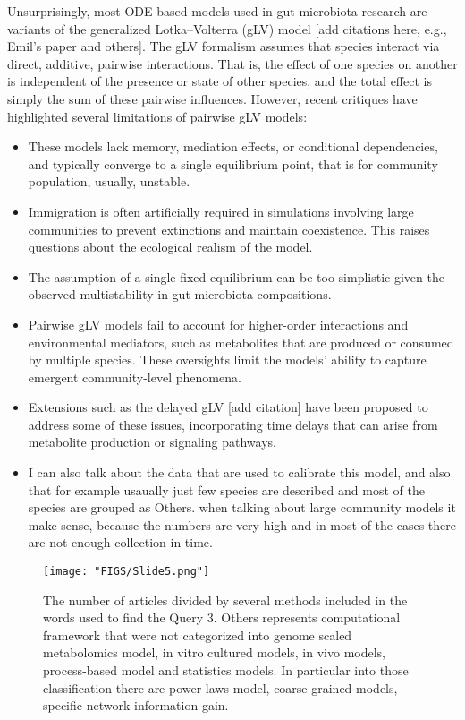 \documentclass[11pt,a4paper,fleqn]{article}
\begin{document}
\indent Unsurprisingly, most ODE-based models used in gut microbiota research
are variants of the generalized Lotka–Volterra (gLV) model [add citations here, e.g., Emil's paper and others].
The gLV formalism assumes that species interact via direct, additive, pairwise interactions.
That is, the effect of one species on another is independent of the presence or state of other species,
and the total effect is simply the sum of these pairwise influences.
\indent However, recent critiques have highlighted several limitations of pairwise gLV models:
\begin{itemize}
	\item These models lack memory, mediation effects, or conditional dependencies, and typically converge to a single equilibrium point, that is for community population, usually, unstable.
	\item Immigration is often artificially required in simulations involving large communities to prevent extinctions and maintain coexistence. This raises questions about the ecological realism of the model.
	\item The assumption of a single fixed equilibrium can be too simplistic given the observed multistability in gut microbiota compositions.
	\item Pairwise gLV models fail to account for higher-order interactions and environmental mediators, such as metabolites that are produced or consumed by multiple species. These oversights limit the models' ability to capture emergent community-level phenomena.
	\item Extensions such as the delayed gLV [add citation] have been proposed to address some of these issues, incorporating time delays that can arise from metabolite production or signaling pathways.
	\item I can also talk about the data that are used to calibrate this model, and also that for example usaually just few species are described and most of the species are grouped as Others. when talking about large community models it make sense, because the numbers are very high and in most of the cases there are not enough collection in time.
	

\end{itemize}

\begin{figure}[h]
	    \centering
    \texttt{[image: "FIGS/Slide5.png"]} %
    \caption{\label{fig:sample1} The number of articles divided by several methods included in the words used to find the Query 3. Others represents computational framework that were not categorized into genome scaled metabolomics model, in vitro cultured models, in vivo models, process-based model and statistics models. In particular into those classification there are power laws model, coarse grained models, specific network information gain.}
    
\end{figure}
\end{document}
